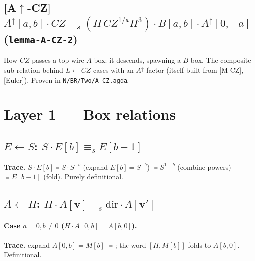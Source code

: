 \documentclass[a4paper]{article}
\newcommand{\lem}[1]{\textsf{[#1]}}      %
\begin{document}
\subsection*{\lem{A$\uparrow$-CZ} \; $A^{\uparrow}[a,b]\cdot CZ \equiv_s (H\,CZ^{1/a}H^3)\cdot B[a,b]\cdot A^{\uparrow}[0,-a]$ \hfill (\texttt{lemma-A-CZ-2})}
How $CZ$ passes a top-wire $A$ box: it descends, spawning a $B$ box. The composite sub-relation behind $L\leftarrow CZ$ cases with an $A^{\uparrow}$ factor (itself built from \lem{M-CZ}, \lem{Euler}). Proven in \texttt{N/BR/Two/A-CZ.agda}.

\section{Layer 1 — Box relations}\label{sec:rel}

\subsection{$E\leftarrow S$: \; $S\cdot E[b]\equiv_s E[b-1]$}
\begin{center}\end{center}
\begin{center}\end{center}
\textbf{Trace.}
$S\cdot E[b]
 \;\overset{=}{\;}\; S\cdot S^{-b}$ (expand $E[b]=S^{-b}$)
 $\;\overset{=}{\;}\; S^{1-b}$ (combine powers)
 $\;\overset{=}{\;}\; E[b-1]$ (fold). Purely definitional.

\subsection{$A\leftarrow H$: \; $H\cdot A[\mathbf v]\equiv_s \mathrm{dir}\cdot A[\mathbf v']$}
\begin{center}\end{center}

\paragraph{Case $a=0,b\neq0$ \;($H\cdot A[0,b]=A[b,0]$).}
\begin{center}\end{center}
\textbf{Trace.} expand $A[0,b]=M[b]$ $\;\overset{=}{\;}$ ; the word $[H,M[b]]$ folds to $A[b,0]$. Definitional.
\end{document}
